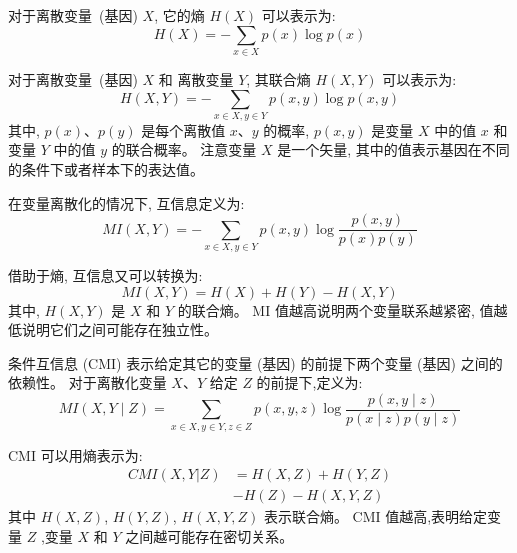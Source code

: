 
对于离散变量~(基因) $X$, 它的熵 $H(X)$ 可以表示为:
\begin{equation} %
  \label{eq:h}
  H(X)=-\sum_{x \in X} p(x) \log p(x)
\end{equation}

对于离散变量~(基因) $X$ 和 离散变量 $Y$, 其联合熵 $H(X, Y)$ 可以表示为: 
\begin{equation} %
H(X, Y)=-\sum_{x \in X, y \in Y} p(x, y) \log p(x, y)
\end{equation}
其中, $p(x)$、$p(y)$ 是每个离散值 $x$、$y$ 的概率, 
$p(x,y)$ 是变量 $X$ 中的值 $x$ 和变量 $Y$ 中的值 $y$ 的联合概率。
注意变量 $X$ 是一个矢量, 其中的值表示基因在不同的条件下或者样本下的表达值。 

在变量离散化的情况下, 互信息定义为:
\begin{equation} %
    MI(X, Y)=-\sum_{x \in X, y \in Y} p(x, y) \log \frac{p(x, y)}{p(x) p(y)}
\end{equation}

借助于熵, 互信息又可以转换为:
\begin{equation} %
  MI(X, Y)=H(X)+H(Y)-H(X, Y)
\end{equation}
其中, $H(X,Y)$ 是 $X$ 和 $Y$ 的联合熵。
MI 值越高说明两个变量联系越紧密, 值越低说明它们之间可能存在独立性。

条件互信息 (CMI) 表示给定其它的变量 (基因) 的前提下两个变量 (基因) 之间的依赖性。
对于离散化变量 $X$、$Y$ 给定 $Z$ 的前提下,定义为: 
\begin{equation}
  MI(X, Y \mid Z)=\sum_{x \in X, y \in Y, z \in Z} p(x, y, z) \log \frac{p(x, y \mid z)}{p(x \mid z) p(y \mid z)}
\end{equation}

CMI 可以用熵表示为:
\begin{equation}
\begin{split}
CMI(X,Y|Z) &= H(X,Z) + H(Y,Z)\\
               & - H(Z) - H(X,Y,Z)
\end{split}
\end{equation}
其中 $H(X,Z)$, $H(Y,Z)$, $H(X,Y,Z)$ 表示联合熵。
CMI 值越高,表明给定变量 $Z$ ,变量 $X$ 和 $Y$ 之间越可能存在密切关系。

